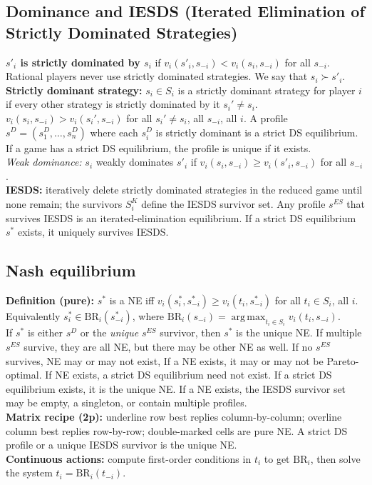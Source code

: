 \documentclass[10pt]{article}
\newcommand{\vi}{v_i}
\newcommand{\BR}{\mathrm{BR}}
\newcommand{\argmax}{\mathop{\mathrm{arg\,max}}}
\begin{document}
\subsection*{Dominance and IESDS (Iterated Elimination of Strictly Dominated Strategies)}
\textbf{$s'_i$ is strictly dominated by $s_i$} if $\vi(s'_i,s_{-i})<\vi(s_i,s_{-i})$ for all $s_{-i}$. Rational players never use strictly dominated strategies. We say that $s_i \succ s'_i$.\\
\textbf{Strictly dominant strategy:} $s_i \in S_i$ is a strictly dominant strategy for player $i$ if every other strategy is strictly dominated by it $s_i'\neq s_i$.
$v_i(s_i,s_{-i})>v_i(s_i',s_{-i})$ for all $s_i'\neq s_i$, all $s_{-i}$, all $i$. A profile $s^D=(s_1^D,\dots,s_n^D)$ where each $s_i^D$ is strictly dominant is a strict DS equilibrium. If a game has a strict DS equilibrium, the profile is unique if it exists.\\
\textit{Weak dominance:} $s_i$ weakly dominates $s'_i$ if $\vi(s_i,s_{-i})\geq \vi(s'_i,s_{-i})$ for all $s_{-i}$.\\
\textbf{IESDS:} iteratively delete strictly dominated strategies in the reduced game until none remain; the survivors $S_i^K$ define the IESDS survivor set. Any profile $s^{ES}$ that survives IESDS is an iterated-elimination equilibrium. If a strict DS equilibrium $s^*$ exists, it uniquely survives IESDS.

\subsection*{Nash equilibrium}
\textbf{Definition (pure):} $s^*$ is a NE iff $\vi(s_i^*,s_{-i}^*)\ge \vi(t_i,s_{-i}^*)$ for all $t_i\in S_i$, all $i$. Equivalently $s_i^*\in \BR_i(s_{-i}^*)$, where $\BR_i(s_{-i})=\argmax_{t_i\in S_i}\vi(t_i,s_{-i})$.\\
If $s^*$ is either $s^D$ or the \textit{unique} $s^{ES}$ survivor, then $s^*$ is the unique NE. If multiple $s^{ES}$ survive, they are all NE, but there may be other NE as well. If no $s^{ES}$ survives, NE may or may not exist, If a NE exists, it may or may not be Pareto-optimal. If NE exists, a strict DS equilibrium need not exist. If a strict DS equilibrium exists, it is the unique NE. If a NE exists, the IESDS survivor set may be empty, a singleton, or contain multiple profiles.\\
\textbf{Matrix recipe (2p):} underline row best replies column-by-column; overline column best replies row-by-row; double-marked cells are pure NE. A strict DS profile or a unique IESDS survivor is the unique NE.\\
\textbf{Continuous actions:} compute first-order conditions in $t_i$ to get $\BR_i$, then solve the system $t_i=\BR_i(t_{-i})$.
\end{document}
